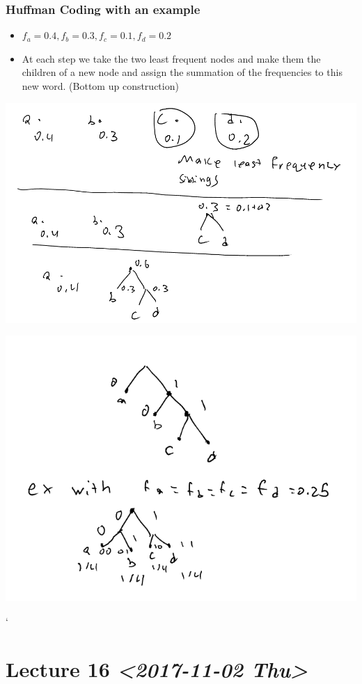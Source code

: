 \documentclass[11pt]{article}
\begin{document}
\subsubsection{Huffman Coding with an example}
\label{sec:org1f68fbd}
\begin{itemize}
\item \(f_a =0.4, f_b = 0.3, f_c = 0.1, f_d = 0.2\)
\item At each step we take the two least frequent nodes and make them the children of a new node and assign the summation of the frequencies to this new word. (Bottom up construction)
\end{itemize}
\begin{center}
\includegraphics[width=.9\linewidth]{./Images/i64.png}
\end{center}
\begin{center}
\includegraphics[width=.9\linewidth]{./Images/i65.png}
\end{center}`
\section{Lecture 16 \textit{<2017-11-02 Thu>}}
\label{sec:org2f884f4}
\end{document}
